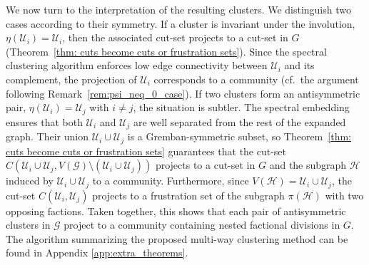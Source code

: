 \documentclass[reprint,onecolumn]{article}
\newcommand{\mc}[1]{\mathcal{#1}}
\newcommand{\1}{\mathbb{1}}
\newcommand{\0}{\mathbf{0}}
\begin{document}
We now turn to the interpretation of the resulting clusters. We distinguish two cases according to their symmetry. If a cluster is invariant under the involution, $\eta(\mc U_i)=\mc U_i$, then the associated cut-set projects to a cut-set in $G$ (Theorem~\ref{thm: cuts become cuts or frustration sets}). Since the spectral clustering algorithm enforces low edge connectivity between $\mc U_i$ and its complement, the projection of $\mc U_i$ corresponds to a community (cf.\ the argument following Remark~\ref{rem:psi_neq_0_case}). If two clusters form an antisymmetric pair, $\eta(\mc U_i)=\mc U_j$ with $i\neq j$, the situation is subtler. The spectral embedding ensures that both $\mc U_i$ and $\mc U_j$ are well separated from the rest of the expanded graph. Their union $\mc U_i \cup \mc U_j$ is a Gremban-symmetric subset, so Theorem~\ref{thm: cuts become cuts or frustration sets} guarantees that the cut-set $C(\mc U_i \cup \mc U_j, V(\mc G)\setminus (\mc U_i \cup \mc U_j))$ projects to a cut-set in $G$ and the subgraph $\mc H$ induced by $\mc U_i \cup \mc U_j$ to a community. Furthermore, since $V(\mc H)=\mc U_i \cup \mc U_j$, the cut-set $C(\mc U_i,\mc U_j)$ projects to a frustration set of the subgraph $\pi(\mc H)$ with two opposing factions. Taken together, this shows that each pair of antisymmetric clusters in $\mc G$ project to a community containing nested factional divisions in $G$. The algorithm summarizing the proposed multi-way clustering method can be found in Appendix \ref{app:extra_theorems}.
\end{document}
